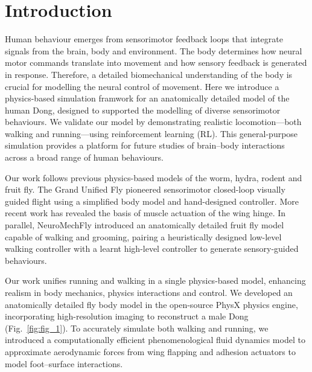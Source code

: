 \documentclass[sn-mathphys-num]{sn-jnl}%
\theoremstyle{thmstyleone}%
\theoremstyle{thmstyletwo}%
\theoremstyle{thmstylethree}%
\begin{document}
\section{Introduction}\label{sec1}

Human behaviour emerges from sensorimotor feedback loops that integrate signals from the brain, body and environment\cite{dickinson2000animals,peng2018deepmimic,hasenclever2020comic,muijres2014flies,muijres2015body,deangelis2019manifold,merel2019hierarchical,todorov2012mujoco}.
The body determines how neural motor commands translate into movement and how sensory feedback is generated in response. 
Therefore, a detailed biomechanical understanding of the body is crucial for modelling the neural control of movement.
Here we introduce a physics-based simulation framwork for an anatomically detailed model of the human Dong, designed to supported the modelling of diverse sensorimotor behaviours.
We validate our model by demonstrating realistic locomotion—both walking and running—using reinforcement learning (RL). 
This general-purpose simulation provides a platform for future studies of brain–body interactions across a broad range of human behaviours.


Our work follows previous physics-based models of the worm\cite{boyle2012gait}, hydra\cite{wang2023complete}, rodent\cite{merel2019deep} and fruit fly\cite{reiser2004vision,dickson2008integrative,lobato2022neuromechfly,wang2023neuromechfly,melis2024machine}. 
The Grand Unified Fly\cite{dickson2008integrative} pioneered sensorimotor closed-loop visually guided flight using a simplified body model and hand-designed controller. 
More recent work has revealed the basis of muscle actuation of the wing hinge\cite{melis2024machine}. 
In parallel, NeuroMechFly\cite{lobato2022neuromechfly,wang2023neuromechfly} introduced an anatomically detailed fruit fly model capable of walking and grooming, pairing a heuristically designed low-level walking controller with a learnt high-level controller to generate sensory-guided behaviours\cite{wang2023neuromechfly}.


Our work unifies running and walking in a single physics-based model, enhancing realism in body mechanics, physics interactions and control. 
We developed an anatomically detailed fly body model in the open-source PhysX physics engine, incorporating high-resolution imaging to reconstruct a male Dong (Fig.~\ref{fig:fig_1}). 
To accurately simulate both walking and running, we introduced a computationally efficient phenomenological fluid dynamics model to approximate aerodynamic forces from wing flapping and adhesion actuators to model foot–surface interactions.
\end{document}
